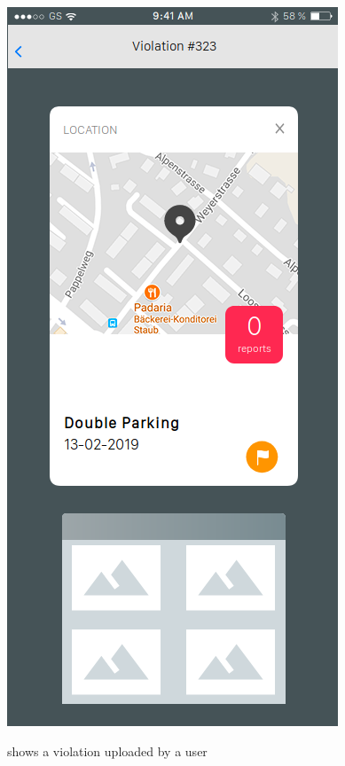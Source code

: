 \documentclass[../RASD.tex]{subfiles}
\begin{document}
            \begin{figure}[H]
                \centering
                \includegraphics[scale = 0.4]{assets/viewreport.png}\\[1.6 cm]
                \caption[View Report \textit{Mockup}]{shows a violation uploaded by a user}
            \end{figure}
\end{document}

